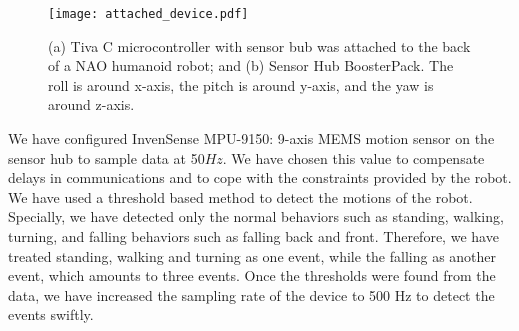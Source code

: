\documentclass[letterpaper]{article}
\begin{document}
\begin{figure}[!ht]
\centering
 \texttt{[image: attached\_device.pdf]}
 \caption{(a) Tiva C microcontroller with sensor bub was attached to the back of a NAO humanoid
robot; and (b) Sensor Hub BoosterPack. The roll is around x-axis, the pitch is around y-axis, and
the yaw is around z-axis.}
 \label{fig:attached_device}
\end{figure}

We have configured InvenSense MPU-9150: 9-axis MEMS motion sensor on the sensor hub to sample data
at 50$Hz$. We have chosen this value to compensate delays in communications and to cope with the
constraints provided by the robot. We have used a threshold based method to detect the motions of
the robot. Specially, we have detected only the normal behaviors such as standing, walking, turning,
and falling behaviors such as falling back and front. Therefore, we have treated standing, walking
and turning as one event, while the falling as another event, which amounts to three events. Once
the thresholds were found from the data, we have increased the sampling rate of the device to 500 Hz
to detect the events swiftly.  
\end{document}
